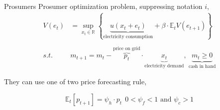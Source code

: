 \documentclass[xcolor={svgnames}]{beamer}
\newcommand{\E}{\mathbb{E}}
\newcommand{\R}{\mathbb{R}}
\begin{document}
\begin{frame}{Prosumers}
    Prosumer optimization problem, suppressing notation $i$,
    \begin{equation*}
        \begin{split}
            V(e_t) &= \sup_{x_t \in \R} \left\{\underbrace{u(x_t + e_t)}_{\text{electricity consumption}} + \beta \cdot \E_t V( e_{t+1} ) \right\} \\
            \\
            \textit{s.t. } &m_{t+1} = m_{t} - \overbrace{p_{t}}^{\text{price on grid}} \cdot \underbrace{x_{t}}_{\text{electricity demand}}, \ \underbrace{m_t  \geq 0}_{\text{cash in hand}}
        \end{split}
    \end{equation*}

    They can use one of two price forecasting rule,

    \begin{equation*}
        \E_t[p_{t+1}] = \psi_h \cdot p_t \ \ 0 < \psi_f < 1 \text{ and } \psi_c > 1
    \end{equation*}


\end{frame}

\end{document}
